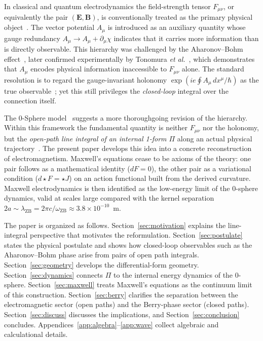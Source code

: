 \documentclass[%
 reprint, amsmath,amssymb, aps, prb, ]{revtex4-2}
\numberwithin{equation}{section}
\newcommand{\omZB}{\omega_{\text{ZB}}}
\newcommand{\hodge}{\star}
\begin{document}
In classical and quantum electrodynamics the field-strength tensor $F_{\mu\nu}$, or equivalently the pair $(\mathbf{E},\mathbf{B})$, is conventionally treated as the primary physical object~\cite{Jackson1998,PeskinSchroeder1995}. The vector potential $A_\mu$ is introduced as an auxiliary quantity whose gauge redundancy $A_\mu \to A_\mu + \partial_\mu\chi$ indicates that it carries more information than is directly observable. This hierarchy was challenged by the Aharonov--Bohm effect~\cite{Aharonov1959}, later confirmed experimentally by Tonomura \emph{et al.}~\cite{Tonomura1986}, which demonstrates that $A_\mu$ encodes physical information inaccessible to $F_{\mu\nu}$ alone. The standard resolution is to regard the gauge-invariant holonomy $\exp(ie\oint A_\mu\,dx^\mu/\hbar)$ as the true observable~\cite{WuYang1975}; yet this still privileges the \emph{closed-loop} integral over the connection itself.

The 0-Sphere model~\cite{hanamura01} suggests a more thoroughgoing revision of the hierarchy. Within this framework the fundamental quantity is neither $F_{\mu\nu}$ nor the holonomy, but the \emph{open-path line integral of an internal 1-form $\Pi$} along an actual physical trajectory~\cite{hanamura31}. The present paper develops this idea into a concrete reconstruction of electromagnetism. Maxwell's equations cease to be axioms of the theory: one pair follows as a mathematical identity ($dF=0$), the other pair as a variational condition ($d{\hodge}F={\hodge}J$) on an action functional built from the derived curvature. Maxwell electrodynamics is then identified as the low-energy limit of the 0-sphere dynamics, valid at scales large compared with the kernel separation $2a \sim \lambda_{\text{ZB}} = 2\pi c/\omZB \approx 3.8\times10^{-10}$~m.

The paper is organized as follows. Section~\ref{sec:motivation} explains the line-integral perspective that motivates the reformulation. Section~\ref{sec:postulate} states the physical postulate and shows how closed-loop observables such as the Aharonov--Bohm phase arise from pairs of open path integrals. Section~\ref{sec:geometry} develops the differential-form geometry. Section~\ref{sec:dynamics} connects $\Pi$ to the internal energy dynamics of the 0-sphere. Section~\ref{sec:maxwell} treats Maxwell's equations as the continuum limit of this construction. Section~\ref{sec:berry} clarifies the separation between the electromagnetic sector (open paths) and the Berry-phase sector (closed paths). Section~\ref{sec:discuss} discusses the implications, and Section~\ref{sec:conclusion} concludes. Appendices~\ref{app:algebra}--\ref{app:wave} collect algebraic and calculational details.
\end{document}
